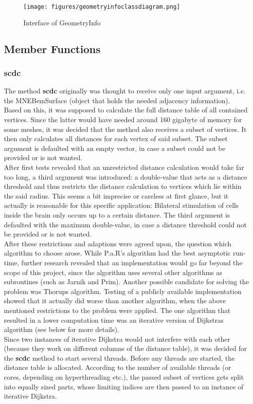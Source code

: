 \begin{figure}[h]
	\begin{center}
		\texttt{[image: figures/geometryinfoclassdiagram.png]}
		\caption{Interface of GeometryInfo}
	\end{center}
\end{figure}

\subsection{Member Functions}

\subsubsection{scdc}
The method \textbf{scdc} originally was thought to receive only one input argument, i.e. the MNEBemSurface (object that holds the needed adjacency information). Based on this, it was supposed to calculate the full distance table of all contained vertices. Since the latter would have needed around 160 gigabyte of memory for some meshes, it was decided that the method also receives a subset of vertices. It then only calculates all distances for each vertex of said subset. The subset argument is defaulted with an empty vector, in case a subset could not be provided or is not wanted.\\
After first tests revealed that an unrestricted distance calculation would take far too long, a third argument was introduced: a double-value that acts as a distance threshold and thus restricts the distance calculation to vertices which lie within the said radius. This seems a bit imprecise or careless at first glance, but it actually is reasonable for this specific application: Bilateral stimulation of cells inside the brain only occurs up to a certain distance. The third argument is defaulted with the maximum double-value, in case a distance threshold could not be provided or is not wanted.\\
After these restrictions and adaptions were agreed upon, the question which algorithm to choose arose.
While P.a.R's algorithm had the best asymptotic run-time, further research revealed that an implementation would go far beyond the scope of this project, since the algorithm uses several other algorithms as subroutines (such as Jarnik and Prim). Another possible candidate for solving the problem was Thorups algorithm. Testing of a publicly available implementation showed that it actually did worse than another algorithm, when the above mentioned restrictions to the problem were applied. The one algorithm that resulted in a lower computation time was an iterative version of Dijkstras algorithm (see below for more details).\\
Since two instances of iterative Dijkstra would not interfere with each other (because they work on different columns of the distance table), it was decided for the \textbf{scdc} method to start several threads. Before any threads are started, the distance table is allocated. According to the number of available threads (or cores, depending on hyperthreading etc.), the passed subset of vertices gets split into equally sized parts, whose limiting indices are then passed to an instance of iterative Dijkstra. 

